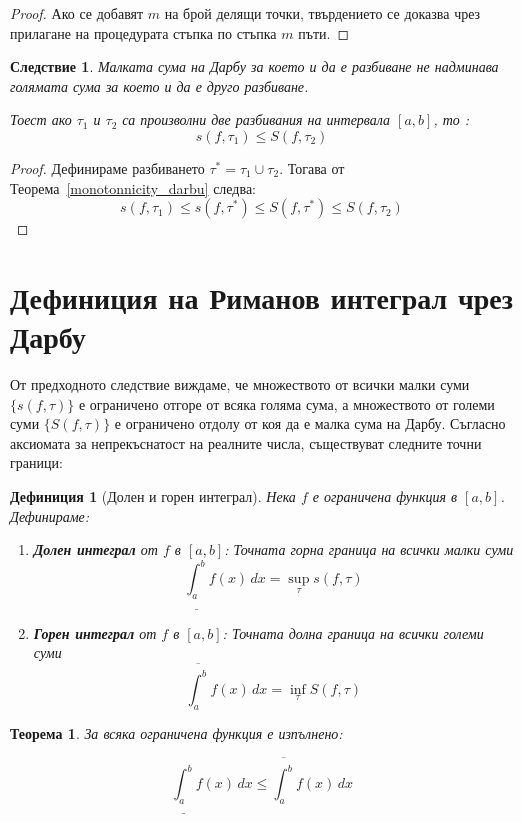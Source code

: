 \documentclass{scrartcl}
\newtheorem{theorem}{Теорема}
\newtheorem{definition}{Дефиниция}
\newtheorem{corollary}{Следствие}
\begin{document}
\begin{FlushLeft}
\begin{proof}
Ако се добавят $m$ на брой делящи точки, твърдението се доказва чрез прилагане на процедурата стъпка по стъпка $m$ пъти.
\end{proof}

\begin{corollary}\label{small_sum_is_smaller_than_bigger_sum}
Малката сума на Дарбу за което и да е разбиване не надминава голямата сума за което и да е друго разбиване.

Тоест ако $\tau_1$ и $\tau_2$ са произволни две разбивания на интервала $[a, b]$, то :
\[ s(f, \tau_1) \le S(f, \tau_2) \]
\end{corollary}

\begin{proof}
Дефинираме разбиването $\tau^{*} = \tau_1 \cup \tau_2$. Тогава от Теорема~\ref{monotonnicity_darbu} следва:
\[ s(f, \tau_1) \le s(f, \tau^{*}) \le S(f, \tau^{*}) \le S(f, \tau_2) \]
\end{proof}

\section{Дефиниция на Риманов интеграл чрез Дарбу}

От предходното следствие виждаме, че множеството от всички малки суми $\{s(f, \tau)\}$ е ограничено отгоре от всяка голяма сума, а множеството от големи суми $\{S(f, \tau)\}$ е ограничено отдолу от коя да е малка сума на Дарбу. Съгласно аксиомата за непрекъснатост на реалните числа, съществуват следните точни граници:

\begin{definition}[Долен и горен интеграл]
Нека $f$ е ограничена функция в $[a,b]$. Дефинираме:
\begin{enumerate}
    \item \textbf{Долен интеграл} от $f$ в $[a,b]$: Точната горна граница на всички малки суми
    \[ \underline{\int_{a}^{b}} f(x)\,dx = \sup_{\tau} s(f, \tau) \]
    \item \textbf{Горен интеграл} от $f$ в $[a,b]$: Точната долна граница на всички големи суми
    \[ \overline{\int_{a}^{b}} f(x)\,dx = \inf_{\tau} S(f, \tau) \]
\end{enumerate}
\end{definition}

\begin{theorem}
За всяка ограничена функция е изпълнено:

\[ \underline{\int_a^b} f(x)\,dx \le \overline{\int_a^b} f(x)\,dx \]
\end{theorem}


\end{FlushLeft}
\end{document}
